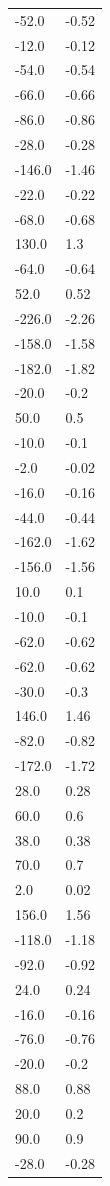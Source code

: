 \begin{longtable}{ll}
-52.0 & -0.52 \\
-12.0 & -0.12 \\
-54.0 & -0.54 \\
-66.0 & -0.66 \\
-86.0 & -0.86 \\
-28.0 & -0.28 \\
-146.0 & -1.46 \\
-22.0 & -0.22 \\
-68.0 & -0.68 \\
130.0 & 1.3 \\
-64.0 & -0.64 \\
52.0 & 0.52 \\
-226.0 & -2.26 \\
-158.0 & -1.58 \\
-182.0 & -1.82 \\
-20.0 & -0.2 \\
50.0 & 0.5 \\
-10.0 & -0.1 \\
-2.0 & -0.02 \\
-16.0 & -0.16 \\
-44.0 & -0.44 \\
-162.0 & -1.62 \\
-156.0 & -1.56 \\
10.0 & 0.1 \\
-10.0 & -0.1 \\
-62.0 & -0.62 \\
-62.0 & -0.62 \\
-30.0 & -0.3 \\
146.0 & 1.46 \\
-82.0 & -0.82 \\
-172.0 & -1.72 \\
28.0 & 0.28 \\
60.0 & 0.6 \\
38.0 & 0.38 \\
70.0 & 0.7 \\
2.0 & 0.02 \\
156.0 & 1.56 \\
-118.0 & -1.18 \\
-92.0 & -0.92 \\
24.0 & 0.24 \\
-16.0 & -0.16 \\
-76.0 & -0.76 \\
-20.0 & -0.2 \\
88.0 & 0.88 \\
20.0 & 0.2 \\
90.0 & 0.9 \\
-28.0 & -0.28 \\

\end{longtable}
